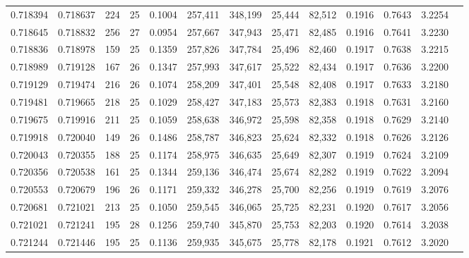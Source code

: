 \begin{tabular}{rrrrrrrrrrrrr}
0.718394 & 0.718637 &   224 &  25 &                                     0.1004 & 257,411 & 348,199 &  25,444 &  82,512 & 0.1916 & 0.7643 & 3.2254 \\
0.718645 & 0.718832 &   256 &  27 &                                     0.0954 & 257,667 & 347,943 &  25,471 &  82,485 & 0.1916 & 0.7641 & 3.2230 \\
0.718836 & 0.718978 &   159 &  25 &                                     0.1359 & 257,826 & 347,784 &  25,496 &  82,460 & 0.1917 & 0.7638 & 3.2215 \\
0.718989 & 0.719128 &   167 &  26 &                                     0.1347 & 257,993 & 347,617 &  25,522 &  82,434 & 0.1917 & 0.7636 & 3.2200 \\
0.719129 & 0.719474 &   216 &  26 &                                     0.1074 & 258,209 & 347,401 &  25,548 &  82,408 & 0.1917 & 0.7633 & 3.2180 \\
0.719481 & 0.719665 &   218 &  25 &                                     0.1029 & 258,427 & 347,183 &  25,573 &  82,383 & 0.1918 & 0.7631 & 3.2160 \\
0.719675 & 0.719916 &   211 &  25 &                                     0.1059 & 258,638 & 346,972 &  25,598 &  82,358 & 0.1918 & 0.7629 & 3.2140 \\
0.719918 & 0.720040 &   149 &  26 &                                     0.1486 & 258,787 & 346,823 &  25,624 &  82,332 & 0.1918 & 0.7626 & 3.2126 \\
0.720043 & 0.720355 &   188 &  25 &                                     0.1174 & 258,975 & 346,635 &  25,649 &  82,307 & 0.1919 & 0.7624 & 3.2109 \\
0.720356 & 0.720538 &   161 &  25 &                                     0.1344 & 259,136 & 346,474 &  25,674 &  82,282 & 0.1919 & 0.7622 & 3.2094 \\
0.720553 & 0.720679 &   196 &  26 &                                     0.1171 & 259,332 & 346,278 &  25,700 &  82,256 & 0.1919 & 0.7619 & 3.2076 \\
0.720681 & 0.721021 &   213 &  25 &                                     0.1050 & 259,545 & 346,065 &  25,725 &  82,231 & 0.1920 & 0.7617 & 3.2056 \\
0.721021 & 0.721241 &   195 &  28 &                                     0.1256 & 259,740 & 345,870 &  25,753 &  82,203 & 0.1920 & 0.7614 & 3.2038 \\
0.721244 & 0.721446 &   195 &  25 &                                     0.1136 & 259,935 & 345,675 &  25,778 &  82,178 & 0.1921 & 0.7612 & 3.2020 \\

\end{tabular}
